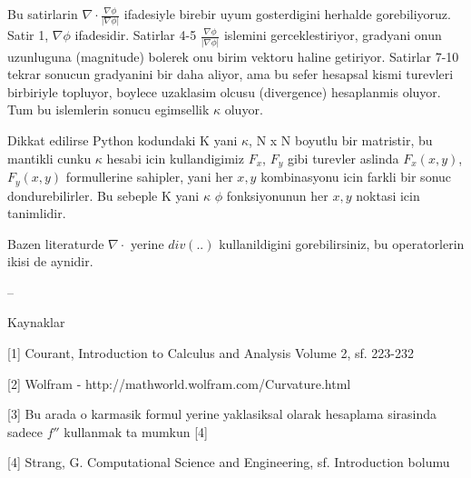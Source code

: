 \documentclass[12pt,fleqn]{article}\usepackage{../common}
\begin{document}
Bu satirlarin $\nabla \cdot \frac{\nabla \phi}{|\nabla \phi|}$ ifadesiyle
birebir uyum gosterdigini herhalde gorebiliyoruz. Satir 1, $\nabla \phi$
ifadesidir. Satirlar 4-5 $\frac{\nabla \phi}{|\nabla \phi|}$ islemini
gerceklestiriyor, gradyani onun uzunluguna (magnitude) bolerek onu birim vektoru
haline getiriyor. Satirlar 7-10 tekrar sonucun gradyanini bir daha aliyor, ama bu
sefer hesapsal kismi turevleri birbiriyle topluyor, boylece uzaklasim olcusu
(divergence) hesaplanmis oluyor. Tum bu islemlerin sonucu egimsellik $\kappa$
oluyor.

Dikkat edilirse Python kodundaki K yani $\kappa$, N x N boyutlu bir matristir,
bu mantikli cunku $\kappa$ hesabi icin kullandigimiz $F_x$, $F_y$ gibi
turevler aslinda $F_x(x,y)$, $F_y(x,y)$ formullerine sahipler, yani her $x,y$
kombinasyonu icin farkli bir sonuc dondurebilirler. Bu sebeple K yani $\kappa$
$\phi$ fonksiyonunun her $x,y$ noktasi icin tanimlidir. 

Bazen literaturde $\nabla \cdot$ yerine $div(..)$ kullanildigini gorebilirsiniz,
bu operatorlerin ikisi de aynidir.

--

Kaynaklar

[1] Courant, Introduction to Calculus and Analysis Volume 2, sf. 223-232

[2] Wolfram - http://mathworld.wolfram.com/Curvature.html

[3] Bu arada o karmasik formul yerine yaklasiksal olarak hesaplama
sirasinda sadece $f''$ kullanmak ta mumkun [4]

[4] Strang, G. Computational Science and Engineering, sf. Introduction bolumu
\end{document}
